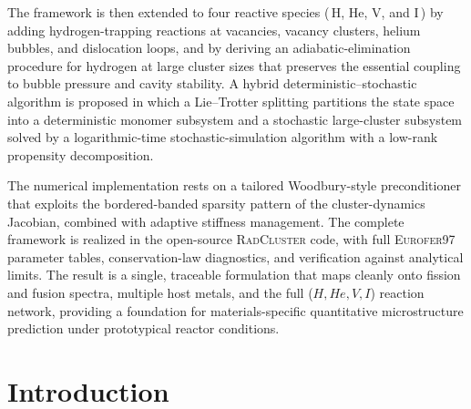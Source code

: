 \documentclass[sn-mathphys-ay,Numbered]{sn-jnl}
\begin{document}
{The framework is then extended to four reactive species
(\,H, He, V, and I\,) by adding hydrogen-trapping reactions at
vacancies, vacancy clusters, helium bubbles, and dislocation loops,
and by deriving an adiabatic-elimination procedure for hydrogen at
large cluster sizes that preserves the essential coupling to bubble
pressure and cavity stability. A hybrid deterministic--stochastic
algorithm is proposed in which a Lie--Trotter splitting partitions
the state space into a deterministic monomer subsystem and a
stochastic large-cluster subsystem solved by a logarithmic-time
stochastic-simulation algorithm with a low-rank propensity
decomposition.

The numerical implementation rests on a tailored Woodbury-style
preconditioner that exploits the bordered-banded sparsity pattern
of the cluster-dynamics Jacobian, combined with adaptive stiffness
management. The complete framework is realized in the open-source
\textsc{RadCluster} code, with full \textsc{Eurofer97} parameter
tables, conservation-law diagnostics, and verification against
analytical limits. The result is a single, traceable formulation
that maps cleanly onto fission and fusion spectra, multiple host
metals, and the full ($H,He,V,I$) reaction network, providing a
foundation for materials-specific quantitative microstructure
prediction under prototypical reactor conditions.%
}


\maketitle

\section{Introduction}\label{sec:introduction}
\end{document}
